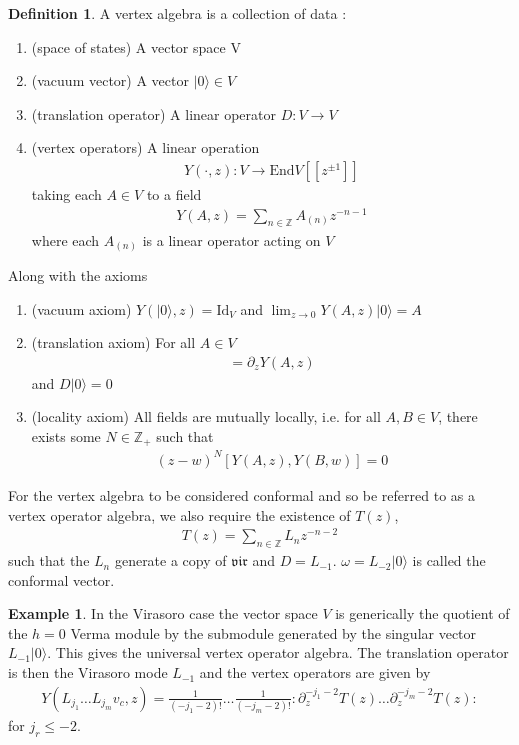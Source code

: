 \documentclass[a4paper,reqno,12pt]{report}
\theoremstyle{definition}
\newtheorem{exmp}{Example}[section]
\newtheorem{defn}{Definition}[section]
\newcommand{\Z}{\mathbb{Z}}
\newcommand{\ket}{\rangle}
\numberwithin{equation}{section}
\renewcommand{\le}{\leqslant}
\theoremstyle{plain}
\begin{document}
\begin{defn}
A vertex algebra is a collection of data \cite{FrenkVert01}:

\begin{enumerate}
\item (space of states) A vector space V
\item (vacuum vector) A vector $|0\ket \in V$
\item (translation operator) A linear operator $D:V\rightarrow V$
\item (vertex operators) A linear operation
\begin{align*}
Y(\cdot, z):V\rightarrow \text{End}V[[z^{\pm 1}]]
\end{align*}
taking each $A\in V$ to a field
\begin{align*}
Y(A, z) = \sum_{n\in \Z} A_{(n)}z^{-n-1}
\end{align*}
where each  $A_{(n)}$ is a linear operator acting on $V$
\end{enumerate}
Along with the axioms
\begin{enumerate}
\item (vacuum axiom) $Y(|0\ket,z) = \text{Id}_V$ and $\lim_{z\rightarrow 0} Y(A,z)|0\ket = A$
\item (translation axiom) For all $A\in V$
\begin{align*}
[D,Y(A,z)] = \partial_z Y(A,z)
\end{align*}
and $D|0\ket=0$
\item (locality axiom) All fields are mutually locally, i.e. for all $A,B\in V$, there exists some $N\in \Z_{+}$ such that
\begin{align*}
(z-w)^N[Y(A,z), Y(B,w)] = 0
\end{align*}
\end{enumerate}

For the vertex algebra to be considered conformal and so be referred to as a vertex operator algebra, we also require the existence of $T(z)$,
\begin{align*}
T(z) = \sum_{n\in \Z} L_nz^{-n-2}
\end{align*}
such that the $L_n$ generate a copy of $\mathfrak{vir}$ and $D=L_{-1}$. $\omega = L_{-2}|0\ket$ is called the conformal vector.
\end{defn}




\begin{exmp} In the Virasoro case the vector space $V$ is generically the quotient of the $h=0$ Verma module by the submodule generated by the singular vector $L_{-1}|0\rangle$. This gives the universal vertex operator algebra. The translation operator is then the Virasoro mode $L_{-1}$ and the vertex operators are given by 
\begin{align*}
Y(L_{j_1}\dots L_{j_m}v_c,z) = \frac{1}{(-j_1-2)!}\dots\frac{1}{(-j_m-2)!}:\partial_z^{-j_1-2}T(z)\dots\partial_{z}^{-j_m-2}T(z):
\end{align*}
for $j_r\le-2$.
\end{exmp}
\end{document}
